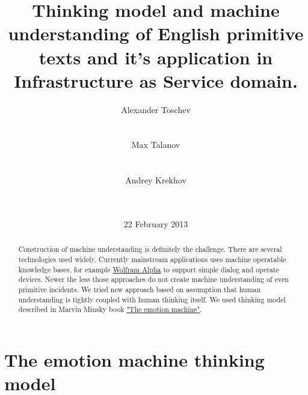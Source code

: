 \documentclass{acm_proc_article-sp}
\begin{document}
\title{Thinking model and machine understanding of English primitive texts and it's application in Infrastructure as Service domain.}

\author{
\alignauthor Alexander Toschev\\
       \\
       \\
\alignauthor Max Talanov\\
       \\
       \\
\alignauthor Andrey Krekhov\\
       \\
       \\
}

\date{22 February 2013}

\maketitle

\begin{abstract}

Construction of machine understanding is definitely the challenge. There are several technologies used widely.
Currently mainstream applications uses machine operatable knowledge bases, for example \href{http://www.wolframalpha.com}{Wolfram Alpha} to support simple dialog and operate devices.
Newer the less those approaches do not create machine understanding of even primitive incidents.
We tried new approach based on assumption that human understanding is tightly coupled with human thinking itself.
We used thinking model described in Marvin Minsky book \href{http://en.wikipedia.org/wiki/The_Emotion_Machine}{"The emotion machine"}.


\end{abstract}

\section{The emotion machine thinking model}
\end{document}
